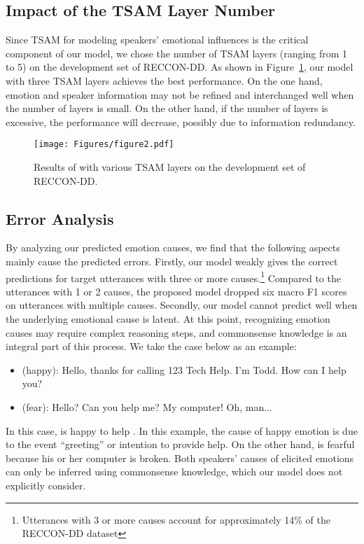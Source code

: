 \documentclass[11pt]{article}
\begin{document}
\subsection{Impact of the TSAM Layer Number}
Since TSAM for modeling speakers' emotional influences is the critical component of our model, we chose the number of TSAM layers  (ranging from 1 to 5) on the development set of RECCON-DD. As shown in Figure~\ref{fig-3}, our model with three TSAM layers achieves the best performance. On the one hand, emotion and speaker information may not be refined and interchanged well when the number of layers is small. On the other hand, if the number of layers is excessive, the performance will decrease, possibly due to information redundancy.

\begin{figure}[htbp]
	\centering  \texttt{[image: Figures/figure2.pdf]}
\caption{Results of  with various TSAM layers on the development set of RECCON-DD.}\label{fig-3}
\end{figure}




\subsection{Error Analysis}
By analyzing our predicted emotion causes, we find that the following aspects mainly cause the predicted errors. Firstly, our model weakly gives the correct predictions for target utterances with three or more causes.\footnote{Utterances with 3 or more causes account for approximately 14\% of the RECCON-DD dataset}  Compared to the utterances with 1 or 2 causes, the proposed model dropped six macro F1 scores on utterances with multiple causes. Secondly, our model cannot predict well when the underlying emotional cause is latent. At this point, recognizing emotion causes may require complex reasoning steps, and commonsense knowledge is an integral part of this process. We take the case below as an example:
\begin{itemize}
\item  (happy): Hello, thanks for calling 123 Tech Help. I'm Todd. How can I help you?

\item  (fear): Hello? Can you help me? My computer! Oh, man...
\end{itemize}
In this case,  is happy to help . In this example, the cause of happy emotion is due to the event ``greeting'' or intention to provide help. On the other hand,  is fearful because his or her computer is broken. Both speakers' causes of elicited emotions can only be inferred using commonsense knowledge, which our model does not explicitly consider.
\end{document}
